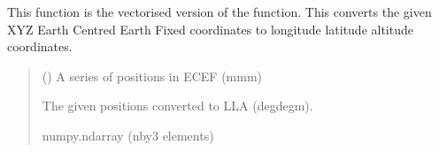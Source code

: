 \documentclass[letterpaper,10pt,english]{sphinxmanual}
\begin{document}
\begin{fulllineitems}
\label{\detokenize{modules/util/transformations:qnav.util.transformations.ecef2lla_vec}}
\pysigstartsignatures
{}
\pysigstopsignatures
\sphinxAtStartPar
This function is the vectorised version of the
{\hyperref[\detokenize{modules/util/transformations:qnav.util.transformations.ecef2lla}]{}} function.
This converts the given XYZ Earth Centred Earth Fixed coordinates to
longitude latitude altitude coordinates.
\begin{quote}\begin{description}
\sphinxAtStartPar
{} (\sphinxstyleliteralemphasis{\sphinxupquote{ (}}\sphinxstyleliteralemphasis{\sphinxupquote{)}}) \textendash{} A series of positions in ECEF (m\sphinxhyphen{}m\sphinxhyphen{}m)

\sphinxAtStartPar
The given positions converted to LLA (deg\sphinxhyphen{}deg\sphinxhyphen{}m).

\sphinxAtStartPar
numpy.ndarray (n\sphinxhyphen{}by\sphinxhyphen{}3 elements)

\end{description}\end{quote}

\end{fulllineitems}

\end{document}
